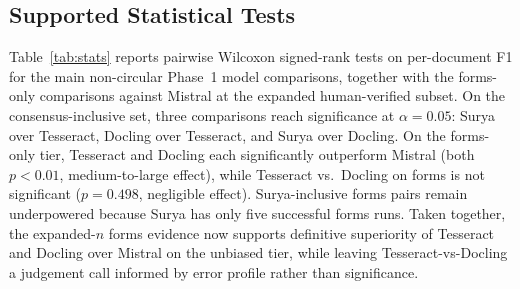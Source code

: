 \documentclass[conference]{IEEEtran}
\begin{document}
\subsection{Supported Statistical Tests}

Table~\ref{tab:stats} reports pairwise Wilcoxon signed-rank tests on per-document F1 for the main non-circular Phase~1 model comparisons, together with the forms-only comparisons against Mistral at the expanded human-verified subset. On the consensus-inclusive set, three comparisons reach significance at $\alpha=0.05$: Surya over Tesseract, Docling over Tesseract, and Surya over Docling. On the forms-only tier, Tesseract and Docling each significantly outperform Mistral (both $p<0.01$, medium-to-large effect), while Tesseract vs.\ Docling on forms is not significant ($p=0.498$, negligible effect). Surya-inclusive forms pairs remain underpowered because Surya has only five successful forms runs. Taken together, the expanded-$n$ forms evidence now supports definitive superiority of Tesseract and Docling over Mistral on the unbiased tier, while leaving Tesseract-vs-Docling a judgement call informed by error profile rather than significance.

\begin{table}[t]
\centering
\caption{Supported pairwise Wilcoxon tests on per-document F1. Consensus-inclusive rows exclude Mistral due to consensus-GT circularity. Forms-only rows use the human-verified $n=20$ subset; Tesseract and Docling each significantly outperform Mistral ($p<0.01$), while Tesseract vs.\ Docling is not significant on forms ($p=0.498$).}
\label{tab:stats}
\footnotesize
{}
\end{table}
\end{document}
